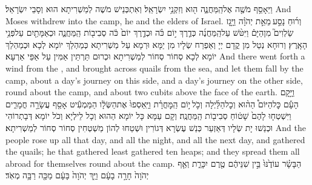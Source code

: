 {וַיֵּאָסֵ֥ף מֹשֶׁ֖ה אֶל\maqqaf הַֽמַּחֲנֶ֑ה ה֖וּא וְזִקְנֵ֥י יִשְׂרָאֵֽל׃}
{וְאִתְכְּנֵישׁ מֹשֶׁה לְמַשְׁרִיתָא הוּא וְסָבֵי יִשְׂרָאֵל׃}
{And Moses withdrew into the camp, he and the elders of Israel.}{}
{וְר֜וּחַ נָסַ֣ע \legarmeh  מֵאֵ֣ת יְהֹוָ֗ה וַיָּ֣גׇז שַׂלְוִים֮ מִן\maqqaf הַיָּם֒ וַיִּטֹּ֨שׁ עַל\maqqaf הַֽמַּחֲנֶ֜ה כְּדֶ֧רֶךְ י֣וֹם כֹּ֗ה וּכְדֶ֤רֶךְ יוֹם֙ כֹּ֔ה סְבִיב֖וֹת הַֽמַּחֲנֶ֑ה וּכְאַמָּתַ֖יִם עַל\maqqaf פְּנֵ֥י הָאָֽרֶץ׃}
{וְרוּחָא נְטַל מִן קֳדָם יְיָ וְאַפְרַח שְׂלָיו מִן יַמָּא וּרְמָא עַל מַשְׁרִיתָא כְּמַהְלַךְ יוֹמָא לְכָא וּכְמַהְלַךְ יוֹמָא לְכָא סְחוֹר סְחוֹר לְמַשְׁרִיתָא וּכְרוּם תַּרְתֵּין אַמִּין עַל אַפֵּי אַרְעָא׃}
{And there went forth a wind from the \lord, and brought across quails from the sea, and let them fall by the camp, about a day’s journey on this side, and a day’s journey on the other side, round about the camp, and about two cubits above the face of the earth.}{}
{וַיָּ֣קׇם הָעָ֡ם כׇּל\maqqaf הַיּוֹם֩ הַה֨וּא וְכׇל\maqqaf הַלַּ֜יְלָה וְכֹ֣ל \legarmeh  י֣וֹם הַֽמׇּחֳרָ֗ת וַיַּֽאַסְפוּ֙ אֶת\maqqaf הַשְּׂלָ֔ו הַמַּמְעִ֕יט אָסַ֖ף עֲשָׂרָ֣ה חֳמָרִ֑ים וַיִּשְׁטְח֤וּ לָהֶם֙ שָׁט֔וֹחַ סְבִיב֖וֹת הַֽמַּחֲנֶֽה׃}
{וְקָם עַמָּא כָּל יוֹמָא הַהוּא וְכָל לֵילְיָא וְכֹל יוֹמָא דְּבָתְרוֹהִי וּכְנַשׁוּ יָת שְׂלָיו דְּאַזְעַר כְּנַשׁ עֶשְׂרָא דְּגוֹרִין וּשְׁטַחוּ לְהוֹן מַשְׁטְחִין סְחוֹר סְחוֹר לְמַשְׁרִיתָא׃}
{And the people rose up all that day, and all the night, and all the next day, and gathered the quails; he that gathered least gathered ten heaps; and they spread them all abroad for themselves round about the camp.}{}
{הַבָּשָׂ֗ר עוֹדֶ֙נּוּ֙ בֵּ֣ין שִׁנֵּיהֶ֔ם טֶ֖רֶם יִכָּרֵ֑ת וְאַ֤ף יְהֹוָה֙ חָרָ֣ה בָעָ֔ם וַיַּ֤ךְ יְהֹוָה֙ בָּעָ֔ם מַכָּ֖ה רַבָּ֥ה מְאֹֽד׃}
